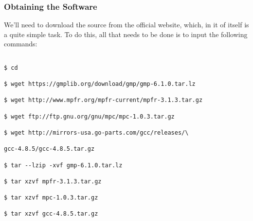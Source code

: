 \documentclass[]{article}
\begin{document}
                                                                                                                                            \subsubsection{Obtaining the Software}
                                                                                                                                            We'll need to download the source from the official website, which, in it of itself is a quite simple task.
                                                                                                                                            To do this, all that needs to be done is to input the following commands:
                                                                                                                                            \begin{lstlisting}
                                                                                                                                            $ cd
                                                                                                                                            $ wget https://gmplib.org/download/gmp/gmp-6.1.0.tar.lz
                                                                                                                                            $ wget http://www.mpfr.org/mpfr-current/mpfr-3.1.3.tar.gz
                                                                                                                                            $ wget ftp://ftp.gnu.org/gnu/mpc/mpc-1.0.3.tar.gz
                                                                                                                                            $ wget http://mirrors-usa.go-parts.com/gcc/releases/\
                                                                                                                                                gcc-4.8.5/gcc-4.8.5.tar.gz
                                                                                                                                                $ tar --lzip -xvf gmp-6.1.0.tar.lz
                                                                                                                                                $ tar xzvf mpfr-3.1.3.tar.gz
                                                                                                                                                $ tar xzvf mpc-1.0.3.tar.gz
                                                                                                                                                $ tar xzvf gcc-4.8.5.tar.gz
                                                                                                                                                \end{lstlisting}
\end{document}
